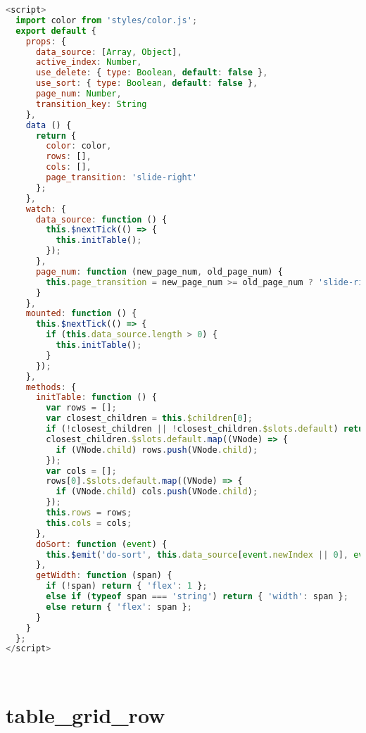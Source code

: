 \begin{lstlisting}[language=JavaScript]
<script>
  import color from 'styles/color.js';
  export default {
    props: {
      data_source: [Array, Object],
      active_index: Number,
      use_delete: { type: Boolean, default: false },
      use_sort: { type: Boolean, default: false },
      page_num: Number,
      transition_key: String
    },
    data () {
      return {
        color: color,
        rows: [],
        cols: [],
        page_transition: 'slide-right'
      };
    },
    watch: {
      data_source: function () {
        this.$nextTick(() => {
          this.initTable();
        });
      },
      page_num: function (new_page_num, old_page_num) {
        this.page_transition = new_page_num >= old_page_num ? 'slide-right' : 'slide-left';
      }
    },
    mounted: function () {
      this.$nextTick(() => {
        if (this.data_source.length > 0) {
          this.initTable();
        }
      });
    },
    methods: {
      initTable: function () {
        var rows = [];
        var closest_children = this.$children[0];
        if (!closest_children || !closest_children.$slots.default) return;
        closest_children.$slots.default.map((VNode) => {
          if (VNode.child) rows.push(VNode.child);
        });
        var cols = [];
        rows[0].$slots.default.map((VNode) => {
          if (VNode.child) cols.push(VNode.child);
        });
        this.rows = rows;
        this.cols = cols;
      },
      doSort: function (event) {
        this.$emit('do-sort', this.data_source[event.newIndex || 0], event.newIndex || 0, event.oldIndex);
      },
      getWidth: function (span) {
        if (!span) return { 'flex': 1 };
        else if (typeof span === 'string') return { 'width': span };
        else return { 'flex': span };
      }
    }
  };
</script>
\end{lstlisting}



\begin{lstlisting}[language=JavaScript]

\end{lstlisting}




\begin{lstlisting}[language=JavaScript]

\end{lstlisting}

\chapter{table\_grid\_row}

